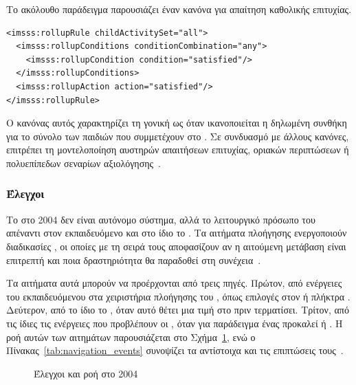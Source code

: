 Το ακόλουθο παράδειγμα παρουσιάζει έναν κανόνα  για απαίτηση καθολικής επιτυχίας.

{\selectfont

\begin{verbatim}
<imsss:rollupRule childActivitySet="all">
  <imsss:rollupConditions conditionCombination="any">
    <imsss:rollupCondition condition="satisfied"/>
  </imsss:rollupConditions>
  <imsss:rollupAction action="satisfied"/>
</imsss:rollupRule>
\end{verbatim}
}

Ο κανόνας αυτός χαρακτηρίζει τη γονική  ως  όταν ικανοποιείται η δηλωμένη συνθήκη για το σύνολο των παιδιών που συμμετέχουν στο . Σε συνδυασμό με άλλους κανόνες, επιτρέπει τη μοντελοποίηση αυστηρών απαιτήσεων επιτυχίας, οριακών περιπτώσεων ή πολυεπίπεδων σεναρίων αξιολόγησης~\cite{ADL_SCORM2004_SN, IMS_SS_RollupModel}.

\subsubsection{Έλεγχοι }

Το  στο  2004 δεν είναι αυτόνομο σύστημα, αλλά το λειτουργικό πρόσωπο του  απέναντι στον εκπαιδευόμενο και στο ίδιο το . Τα αιτήματα πλοήγησης ενεργοποιούν διαδικασίες , οι οποίες με τη σειρά τους αποφασίζουν αν η αιτούμενη μετάβαση είναι επιτρεπτή και ποια δραστηριότητα θα παραδοθεί στη συνέχεια~\cite{ADL_SCORM2004_SN, SCORM_Navigation_Guide}.

Τα αιτήματα αυτά μπορούν να προέρχονται από τρεις πηγές. Πρώτον, από ενέργειες του εκπαιδευόμενου στα χειριστήρια πλοήγησης του , όπως επιλογές στον  ή πλήκτρα . Δεύτερον, από το ίδιο το , όταν αυτό θέτει μια τιμή στο \texttt{} πριν τερματίσει. Τρίτον, από τις ίδιες τις ενέργειες που προβλέπουν οι , όταν για παράδειγμα ένας  προκαλεί  ή . Η ροή αυτών των αιτημάτων παρουσιάζεται στο Σχήμα~\ref{fig:navigation_controls}, ενώ ο Πίνακας~\ref{tab:navigation_events} συνοψίζει τα αντίστοιχα  και τις επιπτώσεις τους~\cite{ADL_SCORM2004_SN, ADL_SCORM_Users_Guide}.

\begin{figure}[htbp]
\centering

\caption{Έλεγχοι  και ροή  στο  2004}
\label{fig:navigation_controls}
\end{figure}

